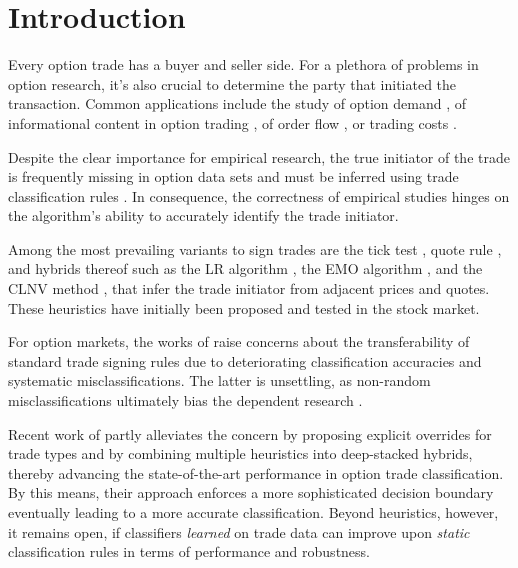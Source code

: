 \section{Introduction}\label{sec:introduction}

Every option trade has a buyer and seller side. For a plethora of problems in option research, it’s also crucial to determine the party that initiated the transaction. Common applications include the study of option demand \autocite[][3]{garleanuDemandBasedOptionPricing2009}, of informational content in option trading \autocites[][631]{huDoesOptionTrading2014}[][882]{panInformationOptionVolume2006}[][1079]{caoInformationalContentOption2005}, of order flow \autocite[][684]{muravyevOrderFlowExpected2016}, or trading costs \autocite[][4980]{muravyevOptionsTradingCosts2020}. 

Despite the clear importance for empirical research, the true initiator of the trade is frequently missing in option data sets and must be inferred using trade classification rules \autocite[][453]{easleyOptionVolumeStock1998}. In consequence, the correctness of empirical studies hinges on the algorithm's ability to accurately identify the trade initiator.

Among the most prevailing variants to sign trades are the tick test \autocite[][240]{hasbrouckTradesQuotesInventories1988}, quote rule \autocite[][41]{harrisDayEndTransactionPrice1989}, and hybrids thereof such as the \gls{LR} algorithm \autocite[][745]{leeInferringTradeDirection1991}, the \gls{EMO} algorithm \autocite[][536]{ellisAccuracyTradeClassification2000}, and the \gls{CLNV} method \autocite[][3809]{chakrabartyTradeClassificationAlgorithms2007}, that infer the trade initiator from adjacent prices and quotes. These heuristics have initially been proposed and tested in the stock market.

For option markets, the works of \textcites[][10--13]{grauerOptionTradeClassification2022}[][887]{savickasInferringDirectionOption2003} raise concerns about the transferability of standard trade signing rules due to deteriorating classification accuracies and systematic misclassifications. The latter is unsettling, as non-random misclassifications ultimately bias the dependent research \autocite[][260]{odders-whiteOccurrenceConsequencesInaccurate2000}.

Recent work of \textcite[][13--16]{grauerOptionTradeClassification2022} partly alleviates the concern by proposing explicit overrides for trade types and by combining multiple heuristics into deep-stacked hybrids, thereby advancing the state-of-the-art performance in option trade classification. By this means, their approach enforces a more sophisticated decision boundary eventually leading to a more accurate classification. Beyond heuristics, however, it remains open, if classifiers \emph{learned} on trade data can improve upon \emph{static} classification rules in terms of performance and robustness.

